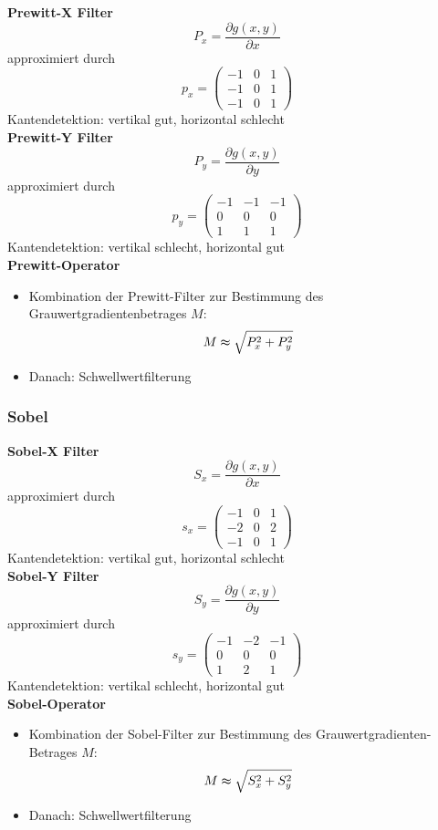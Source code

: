 \textbf{Prewitt-X Filter} $$P_x = \frac{\partial g(x,y)}{\partial x}$$ approximiert durch $$p_x = \left( \begin{array}{ccc} -1 & 0 & 1 \\ -1 & 0 & 1 \\ -1 & 0 & 1 \end{array} \right)$$
Kantendetektion: vertikal gut, horizontal schlecht \\
\textbf{Prewitt-Y Filter} $$P_y = \frac{\partial g(x,y)}{\partial y}$$ approximiert durch $$p_y = \left( \begin{array}{rrr} -1 & -1 & -1 \\ 0 & 0 & 0 \\ 1 & 1 & 1 \end{array} \right)$$
Kantendetektion: vertikal schlecht, horizontal gut \\
\textbf{Prewitt-Operator}
\begin{itemize}
\item Kombination der Prewitt-Filter zur Bestimmung des Grauwertgradientenbetrages $M$: $$M \thickapprox \sqrt{P_x^2 + P_y^2}$$
\item Danach: Schwellwertfilterung
\end{itemize}

\subsubsection{Sobel}

\textbf{Sobel-X Filter} $$S_x = \frac{\partial g(x,y)}{\partial x}$$ approximiert durch $$s_x = \left( \begin{array}{ccc} -1 & 0 & 1 \\ -2 & 0 & 2 \\ -1 & 0 & 1 \end{array} \right)$$
Kantendetektion: vertikal gut, horizontal schlecht \\
\textbf{Sobel-Y Filter} $$S_y = \frac{\partial g(x,y)}{\partial y}$$ approximiert durch $$s_y = \left( \begin{array}{rrr} -1 & -2 & -1 \\ 0 & 0 & 0 \\ 1 & 2 & 1 \end{array} \right)$$
Kantendetektion: vertikal schlecht, horizontal gut \\
\textbf{Sobel-Operator}
\begin{itemize}
\item Kombination der Sobel-Filter zur Bestimmung des Grauwertgradienten-Betrages $M$: $$M \thickapprox \sqrt{S_x^2 + S_y^2}$$
\item Danach: Schwellwertfilterung
\end{itemize}

